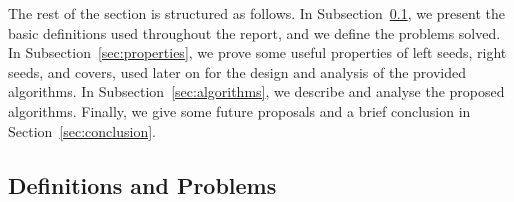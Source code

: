 \documentclass[preprint,12pt]{elsarticle}
\newcommand{\cO}{\ensuremath{\mathcal{O}}}
\begin{document}

The rest of the section is structured as follows.
%
In Subsection~\ref{sec:definitions}, we present the basic definitions used throughout
the report, and we define the problems solved.
%
In Subsection~\ref{sec:properties}, we prove some useful properties of left seeds, right seeds, and covers,
used later on for the design and analysis of the provided algorithms.
%
In Subsection~\ref{sec:algorithms}, we describe and analyse the proposed algorithms. %
%
Finally, we give some future proposals and a brief conclusion in Section~\ref{sec:conclusion}.


\subsection{Definitions and Problems}\label{sec:definitions}
\end{document}
